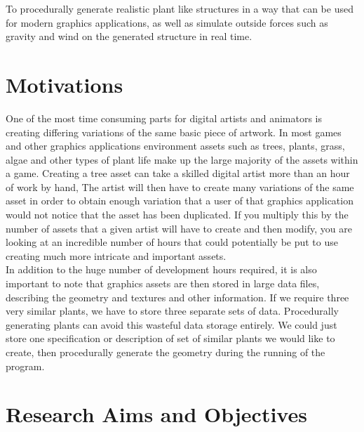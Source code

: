 \begin{flushleft}

To procedurally generate realistic plant like structures in a way that can be used for modern graphics applications, as well as simulate outside forces such as gravity and wind on the generated structure in real time.

\end{flushleft}

\section{Motivations}
 
\begin{flushleft}
One of the most time consuming parts for digital artists and animators is creating differing variations of the same basic piece of artwork. In most games and other graphics applications environment assets such as trees, plants, grass, algae and other types of plant life make up the large majority of the assets within a game. Creating a tree asset can take a skilled digital artist more than an hour of work by hand, The artist will then have to create many variations of the same asset in order to obtain enough variation that a user of that graphics application would not notice that the asset has been duplicated. If you multiply this by the number of assets that a given artist will have to create and then modify, you are looking at an incredible number of hours that could potentially be put to use creating much more intricate and important assets.\\
\vspace{5mm}
In addition to the huge number of development hours required, it is also important to note that graphics assets are then stored in large data files, describing the geometry and textures and other information. If we require three very similar plants, we have to store three separate sets of data. Procedurally generating plants can avoid this wasteful data storage entirely. We could just store one specification or description of set of similar plants we would like to create, then procedurally generate the geometry during the running of the program.\\
\end{flushleft}

\section{Research Aims and Objectives}

